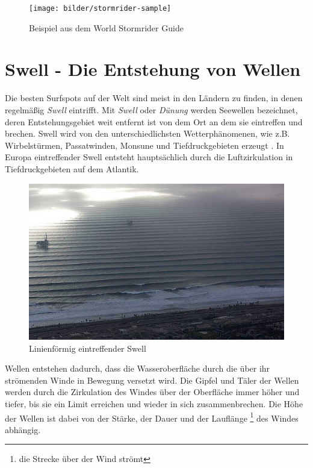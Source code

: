 \begin{figure}[h]
  \begin{center}
    \texttt{[image: bilder/stormrider-sample]}
    \caption{Beispiel aus dem World Stormrider Guide}
  \end{center}
\end{figure}

\section{Swell - Die Entstehung von Wellen}
Die besten Surfspots auf der Welt sind meist in den Ländern zu finden,
in denen regelmäßig \textit{Swell} eintrifft. Mit \textit{Swell} oder
\textit{Dünung} werden Seewellen bezeichnet, deren Entstehungs\-gebiet
weit entfernt ist von dem Ort an dem sie eintreffen und brechen. Swell
wird von den unterschiedlichsten Wetter\-phänomenen, wie
z.B. Wirbelstürmen, Passatwinden, Monsune und Tiefdruckgebieten
erzeugt \cite[S.15]{storm_europe_1998}. In Europa eintreffender Swell
entsteht hauptsächlich durch die Luftzirkulation in Tiefdruckgebieten
auf dem Atlantik.

\begin{figure}[h]
  \begin{center}
    \includegraphics{bilder/swell}
    \caption{Linienförmig eintreffender Swell}
  \end{center}
\end{figure}

Wellen entstehen dadurch, dass die Wasseroberfläche durch die über ihr
strömenden Winde in Bewegung versetzt wird. Die Gipfel und Täler der
Wellen werden durch die Zirkulation des Windes über der Oberfläche
immer höher und tiefer, bis sie ein Limit erreichen und wieder in sich
zusammenbrechen. Die Höhe der Wellen ist dabei von der Stärke, der
Dauer und der Lauflänge \footnote{die Strecke über der Wind strömt}
des Windes abhängig.

